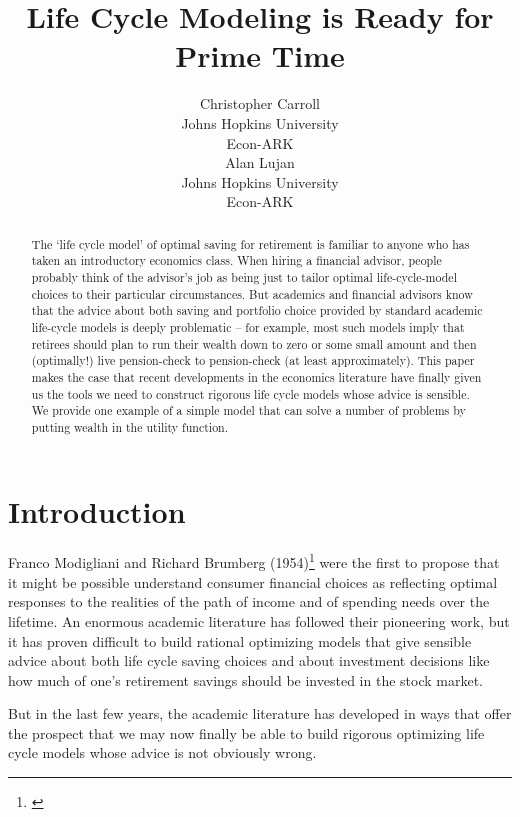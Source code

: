 \documentclass{article}
\title{Life Cycle Modeling is Ready for Prime Time}
\date{\displaydate{articleDate}}
\author{Christopher Carroll\footnotemark[1]\\
Johns Hopkins University\\Econ-ARK\\\AND
Alan Lujan\\
Johns Hopkins University\\Econ-ARK\\}
\begin{document}
\maketitle
{}

\begin{abstract}
The `life cycle model' of optimal saving for retirement is familiar to anyone who has taken an introductory economics class. When hiring a financial advisor, people probably think of the advisor's job as being just to tailor optimal life-cycle-model choices to their particular circumstances. But academics and financial advisors know that the advice about both saving and portfolio choice provided by standard academic life-cycle models is deeply problematic -- for example, most such models imply that retirees should plan to run their wealth down to zero or some small amount and then (optimally!) live pension-check to pension-check (at least approximately). This paper makes the case that recent developments in the economics literature have finally given us the tools we need to construct rigorous life cycle models whose advice is sensible.  We provide one example of a simple model that can solve a number of problems by putting wealth in the utility function.
\end{abstract}

\keywords{}

\section{Introduction}

Franco Modigliani and Richard Brumberg (1954)\footnote{\cite{2005}} were the first to propose that it might be possible understand consumer financial choices as reflecting optimal responses to the realities of the path of income and of spending needs over the lifetime. An enormous academic literature has followed their pioneering work, but it has proven difficult to build rational optimizing models that give sensible advice about both life cycle saving choices and about investment decisions like how much of one's retirement savings should be invested in the stock market.

But in the last few years, the academic literature has developed in ways that offer the prospect that we may now finally be able to build rigorous optimizing life cycle models whose advice is not obviously wrong.

\end{document}
